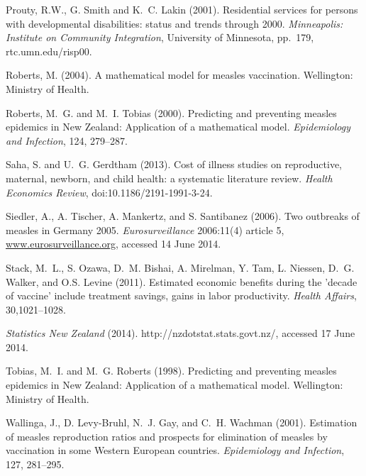 \documentclass{article}
\begin{document}
{\begin{thebibliography}{}
Prouty, R.W., G. Smith and K.~C. Lakin (2001).
\newblock Residential services for persons with developmental disabilities: status and trends through 2000.
\newblock \emph{Minneapolis: Institute on Community Integration}, University of Minnesota, pp.~179, rtc.umn.edu/risp00.

Roberts, M. (2004).
\newblock A mathematical model for measles vaccination.
\newblock Wellington: Ministry of Health.

Roberts, M.~G. and M.~I. Tobias (2000).
\newblock Predicting and preventing measles epidemics in New Zealand: Application of a mathematical model. 
\newblock \emph{Epidemiology and Infection}, 124, 279--287.

Saha, S. and U.~G. Gerdtham (2013).
\newblock Cost of illness studies on reproductive, maternal, newborn, and child health: a systematic literature review.
\newblock \emph{Health Economics Review}, doi:10.1186/2191-1991-3-24.

Siedler, A., A. Tischer, A. Mankertz, and S. Santibanez (2006).
\newblock Two outbreaks of measles in Germany 2005.
\newblock \emph{Eurosurveillance} 2006:11(4) article 5, \href{http://www.eurosurveillance.org/ViewArticle.aspx?ArticleId=615}{www.eurosurveillance.org}, accessed 14 June 2014.

Stack, M.~L., S. Ozawa, D.~M. Bishai, A. Mirelman, Y. Tam, L. Niessen, D.~G. Walker, and O.S. Levine (2011).
\newblock Estimated economic benefits during the 'decade of vaccine' include treatment savings, gains in labor productivity.
\newblock \emph{Health Affairs}, 30,1021--1028.

\newblock \emph{Statistics New Zealand} (2014).
http://nzdotstat.stats.govt.nz/, accessed 17 June 2014.

Tobias, M.~I. and M.~G. Roberts (1998).
\newblock Predicting and preventing measles epidemics in New Zealand: Application of a mathematical model.
\newblock Wellington: Ministry of Health.

Wallinga, J., D. Levy-Bruhl, N.~J. Gay, and C.~H. Wachman (2001).
\newblock Estimation of measles reproduction ratios and prospects for elimination of measles by vaccination in some Western European countries.
\newblock \emph{Epidemiology and Infection}, 127, 281--295.


\end{thebibliography}}
\end{document}
